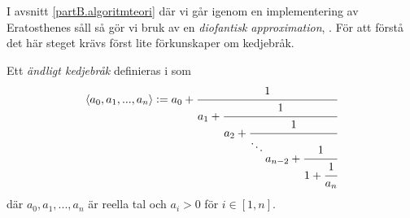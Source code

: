 
I avsnitt \ref{partB.algoritmteori} där vi går igenom en implementering av Eratosthenes såll så gör vi bruk av en \textit{diofantisk approximation}, \cite[Algoritm 4]{HaraldSieve}. För att förstå det här steget krävs först lite förkunskaper om kedjebråk. 

Ett \textit{ändligt kedjebråk} definieras i \cite[Definition 20.1]{Lindahl} som
\begin{align*}
    \langle a_0, a_1, ..., a_n \rangle := a_0 + \cfrac{1}{a_1 + \cfrac{1}{a_2 + \cfrac{1}{\ddots \raisebox{-3mm}{$a_{n-2}+\cfrac{1}{1 + \cfrac{1}{a_n}}$}}}}
\end{align*}
där \(a_0, a_1, ..., a_n\) är reella tal och \(a_i > 0\) för \(i \in [1, n]\).